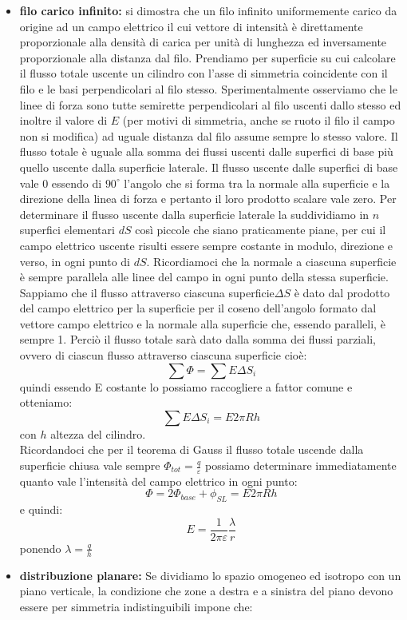 \documentclass[a4paper,12pt, oneside]{book}
\begin{document}
\begin{itemize}
\item \textbf{filo carico infinito:} si dimostra che un filo infinito uniformemente carico da origine ad un campo elettrico il cui vettore di intensità è direttamente proporzionale alla densità di carica per unità di lunghezza ed inversamente proporzionale alla distanza dal filo. Prendiamo per superficie su cui calcolare il flusso totale uscente un cilindro con l'asse di simmetria coincidente con il filo e le basi perpendicolari al filo stesso. Sperimentalmente osserviamo che le linee di forza sono tutte semirette perpendicolari al filo uscenti dallo stesso ed inoltre il valore di $E$ (per motivi di simmetria, anche se ruoto il filo il campo non si modifica) ad uguale distanza dal filo assume sempre lo stesso valore. Il flusso totale è uguale alla somma dei flussi uscenti dalle superfici di base più quello uscente dalla superficie laterale. Il flusso uscente dalle superfici di base vale 0 essendo di $90^{\circ}$ l'angolo che si forma tra la normale alla superficie e la direzione della linea di forza e pertanto il loro prodotto scalare vale zero. Per determinare il flusso uscente dalla superficie laterale la suddividiamo in $n$ superfici elementari $dS$ così piccole che siano praticamente piane, per cui il campo elettrico uscente risulti essere sempre costante in modulo, direzione e verso, in ogni punto di $dS$. Ricordiamoci che la normale a ciascuna superficie è sempre parallela alle linee del campo in ogni punto della stessa superficie. Sappiamo che il flusso attraverso ciascuna superficie$\Delta S$ è dato dal prodotto del campo elettrico per la superficie per il coseno dell’angolo formato dal vettore campo elettrico e la normale alla superficie che, essendo paralleli, è sempre 1. Perciò il flusso totale sarà dato dalla somma dei flussi parziali, ovvero di ciascun flusso attraverso ciascuna superficie cioè:
$$\sum \Phi=\sum E\Delta S_i$$
quindi essendo E costante lo possiamo raccogliere a fattor comune e otteniamo:
$$\sum E\Delta S_i=E2\pi Rh$$
con $h$ altezza del cilindro.\\
Ricordandoci che per il teorema di Gauss il flusso totale uscende dalla superficie chiusa vale sempre $\Phi_{tot}=\frac{q}{\varepsilon}$  possiamo determinare immediatamente quanto vale l'intensità del campo elettrico in ogni punto:
$$\Phi=2\Phi_{base}+\phi_{SL}=E2\pi Rh$$
e quindi:
$$E=\frac{1}{2\pi\varepsilon}\frac{\lambda}{r}$$
ponendo $\lambda=\frac{q}{h}$
\item \textbf{distribuzione planare:} Se dividiamo lo spazio omogeneo ed isotropo con un piano verticale, la condizione che zone a destra e a sinistra del piano devono essere per simmetria indistinguibili impone che:  

\end{itemize}
\end{document}

